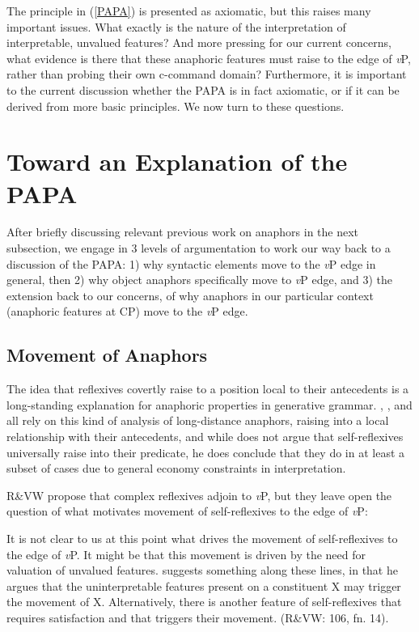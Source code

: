 \documentclass[output=paper
,modfonts
,nonflat
]{langsci/langscibook}
\begin{document}
The principle in (\ref{PAPA}) is presented as axiomatic, but this raises many important issues. What exactly is the nature of the interpretation of interpretable, unvalued features? And more pressing for our current concerns, what evidence is there that these anaphoric features must raise to the edge of \textit{v}P, rather than probing their own c-command domain? Furthermore, it is important to the current discussion whether the PAPA is in fact axiomatic, or if it can be derived from more basic principles. We now turn to these questions.

\section{Toward an Explanation of the PAPA} \label{ExplainPAPA}

After briefly discussing relevant previous work on anaphors in the next subsection, we engage in 3 levels of argumentation to work our way back to a discussion of the PAPA: 1) why syntactic elements move to the \textit{v}P edge in general, then 2) why object anaphors specifically move to \textit{v}P edge, and 3) the extension back to our concerns, of why anaphors in our particular context (anaphoric features at CP) move to the \textit{v}P edge. 

\subsection{Movement of Anaphors}
The idea that reflexives covertly raise to a position local to their antecedents is a long-standing explanation for anaphoric properties in generative grammar. \citet{Safir:2004}, \citet{Pica:1987}, and \citet{Cole:1990} all rely on this kind of analysis of long-distance anaphors, raising into a local relationship with their antecedents, and while \citet{Reuland:2011} does not argue that self-reflexives universally raise into their predicate, he does conclude that they do in at least a subset of cases due to general economy constraints in interpretation. 

R\&VW propose that complex reflexives adjoin to \textit{v}P, but they leave open the question of what motivates movement of self-reflexives to the edge of \textit{v}P: 

\begin{displayquote}

\begin{small}

It is not clear to us at this point what drives the movement of self-reflexives to the edge of \textit{v}P. It might be that this movement is driven by the need for valuation of unvalued features. \citet{Boskovic:2007} suggests something along these lines, in that he argues that the uninterpretable features present on a constituent X may trigger the movement of X. Alternatively, there is another feature of self-reflexives that requires satisfaction and that triggers their movement. (R\&VW: 106, fn. 14).

\end{small}

\end{displayquote}
\end{document}
